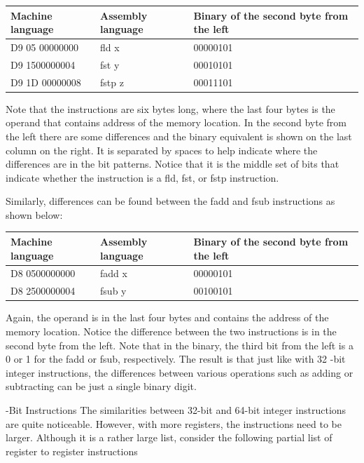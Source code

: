 \documentclass[10pt]{book}
\begin{document}
\begin{center}
\begin{tabular}{|l|l|l|}
\hline
Machine language & Assembly language & Binary of the second byte from the left \\
\hline
D9 05 00000000 & fld x & 00000101 \\
\hline
D9 1500000004 & fst y & 00010101 \\
\hline
D9 1D 00000008 & fstp z & 00011101 \\
\hline
\end{tabular}
\end{center}

Note that the instructions are six bytes long, where the last four bytes is the operand that contains address of the memory location. In the second byte from the left there are some differences and the binary equivalent is shown on the last column on the right. It is separated by spaces to help indicate where the differences are in the bit patterns. Notice that it is the middle set of bits that indicate whether the instruction is a fld, fst, or fstp instruction.

Similarly, differences can be found between the fadd and fsub instructions as shown below:

\begin{center}
\begin{tabular}{|l|l|l|}
\hline
Machine language & Assembly language & Binary of the second byte from the left \\
\hline
D8 0500000000 & fadd x & 00000101 \\
\hline
D8 2500000004 & fsub y & 00100101 \\
\hline
\end{tabular}
\end{center}

Again, the operand is in the last four bytes and contains the address of the memory location. Notice the difference between the two instructions is in the second byte from the left. Note that in the binary, the third bit from the left is a 0 or 1 for the fadd or fsub, respectively. The result is that just like with 32 -bit integer instructions, the differences between various operations such as adding or subtracting can be just a single binary digit.

-Bit Instructions
The similarities between 32-bit and 64-bit integer instructions are quite noticeable. However, with more registers, the instructions need to be larger. Although it is a rather large list, consider the following partial list of register to register instructions
\end{document}
